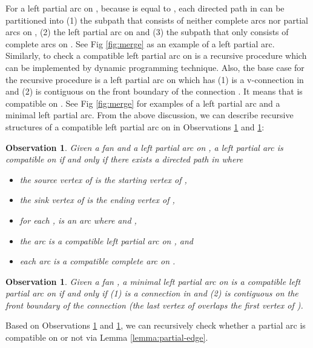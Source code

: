 \documentclass[11pt]{article}
\newtheorem{observation}[figure]{Observation}
\begin{document}
For a left partial arc  on ,
because  is equal to ,
each directed path  in  can be partitioned into
(1) the subpath that consists of neither complete arcs nor partial arcs on ,
(2) the left partial arc on  and
(3) the subpath that only consists of complete arcs on .
See Fig \ref{fig:merge} as an example of a left partial arc.
Similarly, to check a compatible left partial arc on  is a recursive procedure
which can be implemented by dynamic programming technique.
Also, the base case for the recursive procedure
is a left partial arc  on 
which has (1)  is a v-connection in  and
(2)  is contiguous on the front boundary  of the connection .
It means that  is compatible on .
See Fig \ref{fig:merge} for examples of a left partial arc and a minimal left partial arc.
From the above discussion, we can describe recursive structures of a compatible
left partial arc on  in Observations \ref{obs:partial-edge} and \ref{obs:minimal-partial-edge}:


\begin{observation}\label{obs:partial-edge}
Given a fan  and a left partial arc  on ,
a left partial arc  is
compatible on  if and only if
there exists a directed path 
in  where
\begin{itemize}
\item the source vertex of  is the starting vertex of ,
\item the sink vertex of  is the ending vertex of ,
\item for each , 
is an arc where  and ,
\item the arc  is a compatible left partial arc on , and
\item each arc  is a compatible complete arc on .
\end{itemize}
\end{observation}


\begin{observation}\label{obs:minimal-partial-edge}
Given a fan ,
a minimal left partial arc  on 
is a compatible left partial arc on  if and only if
(1)  is a connection in  and
(2)  is contiguous on the front boundary  of the connection 
(the last vertex of  overlaps the first vertex of ).
\end{observation}


Based on Observations \ref{obs:partial-edge} and \ref{obs:minimal-partial-edge},
we can recursively check whether a partial arc 
is compatible on  or not via Lemma \ref{lemma:partial-edge}.
\end{document}
